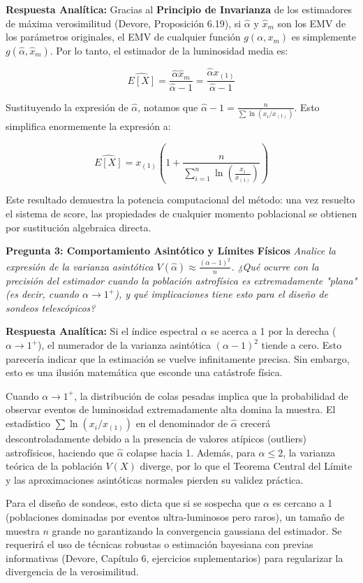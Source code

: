 \textbf{Respuesta Analítica:}
Gracias al \textbf{Principio de Invarianza} de los estimadores de máxima verosimilitud (Devore, Proposición 6.19), si $\hat{\alpha}$ y $\hat{x}_m$ son los EMV de los parámetros originales, el EMV de cualquier función $g(\alpha, x_m)$ es simplemente $g(\hat{\alpha}, \hat{x}_m)$. Por lo tanto, el estimador de la luminosidad media es:

$$ \widehat{E[X]} = \frac{\hat{\alpha} \hat{x}_m}{\hat{\alpha} - 1} = \frac{\hat{\alpha} x_{(1)}}{\hat{\alpha} - 1} $$

Sustituyendo la expresión de $\hat{\alpha}$, notamos que $\hat{\alpha} - 1 = \frac{n}{\sum \ln(x_i / x_{(1)})}$. Esto simplifica enormemente la expresión a:

$$ \widehat{E[X]} = x_{(1)} \left( 1 + \frac{n}{\sum_{i=1}^{n} \ln\left( \frac{x_i}{x_{(1)}} \right)} \right) $$

Este resultado demuestra la potencia computacional del método: una vez resuelto el sistema de score, las propiedades de cualquier momento poblacional se obtienen por sustitución algebraica directa.

\textbf{Pregunta 3: Comportamiento Asintótico y Límites Físicos}
\textit{Analice la expresión de la varianza asintótica $V(\hat{\alpha}) \approx \frac{(\alpha - 1)^2}{n}$. ¿Qué ocurre con la precisión del estimador cuando la población astrofísica es extremadamente "plana" (es decir, cuando $\alpha \to 1^+$), y qué implicaciones tiene esto para el diseño de sondeos telescópicos?}

\textbf{Respuesta Analítica:}
Si el índice espectral $\alpha$ se acerca a 1 por la derecha ($\alpha \to 1^+$), el numerador de la varianza asintótica $(\alpha - 1)^2$ tiende a cero. Esto parecería indicar que la estimación se vuelve infinitamente precisa. Sin embargo, esto es una ilusión matemática que esconde una catástrofe física. 

Cuando $\alpha \to 1^+$, la distribución de colas pesadas implica que la probabilidad de observar eventos de luminosidad extremadamente alta domina la muestra. El estadístico $\sum \ln(x_i / x_{(1)})$ en el denominador de $\hat{\alpha}$ crecerá descontroladamente debido a la presencia de valores atípicos (outliers) astrofísicos, haciendo que $\hat{\alpha}$ colapse hacia 1. Además, para $\alpha \le 2$, la varianza teórica de la población $V(X)$ diverge, por lo que el Teorema Central del Límite y las aproximaciones asintóticas normales pierden su validez práctica. 

Para el diseño de sondeos, esto dicta que si se sospecha que $\alpha$ es cercano a 1 (poblaciones dominadas por eventos ultra-luminosos pero raros), un tamaño de muestra $n$ grande no garantizando la convergencia gaussiana del estimador. Se requerirá el uso de técnicas robustas o estimación bayesiana con previas informativas (Devore, Capítulo 6, ejercicios suplementarios) para regularizar la divergencia de la verosimilitud.
